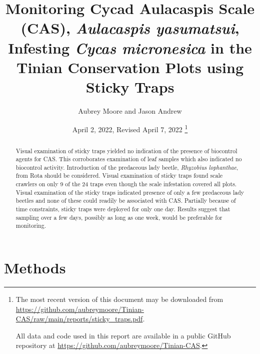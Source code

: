 \documentclass[12pt,letterpaper,english,bibliography=totocnumbered, abstract=on]{scrartcl}
\begin{document}
\titlehead{Technical Report}

\title{Monitoring Cycad Aulacaspis Scale (CAS), \textit{Aulacaspis yasumatsui}, Infesting \textit{Cycas micronesica} in the Tinian Conservation Plots using Sticky Traps}

\author{Aubrey Moore and Jason Andrew}

\date{
	April 2, 2022, Revised April 7, 2022
	\footnote{
		The most recent version of this document may be downloaded from \url{https://github.com/aubreymoore/Tinian-CAS/raw/main/reports/sticky_traps.pdf}.
		
		All data and code used in this report are available in a public GitHub repository at
		\url{https://github.com/aubreymoore/Tinian-CAS}.
	}
}

\maketitle


\begin{abstract}
\item
Visual examination of sticky traps yielded no indication of the presence of biocontrol agents for CAS. This corroborates examination of leaf samples which also indicated no biocontrol activity. Introduction of the predaceous lady beetle, \textit{Rhyzobius lophanthae}, from Rota should be considered.
Visual examination of sticky traps found scale crawlers on only 9 of the 24 traps even though the scale infestation covered all plots. Visual examination of the sticky traps indicated presence of only a few predaceous lady beetles and none of these could readily be associated with CAS.
Partially because of time constraints, sticky traps were deployed for only one day. Results suggest that sampling over a few days, possibly as long as one week, would be preferable for monitoring.

\end{abstract}



\clearpage
\tableofcontents

\clearpage
\section{Methods}
\end{document}
